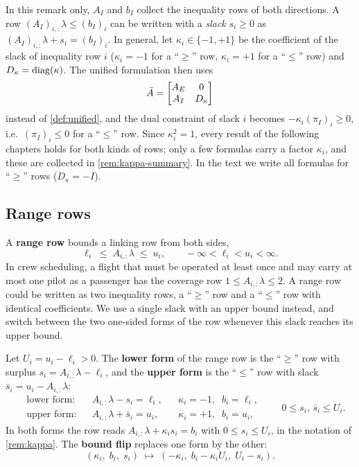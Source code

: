 \begin{remark} \label{rem:kappa}
In this remark only, $A_I$ and $b_I$ collect the inequality rows of both directions. A row
$(A_I)_{i,:}\lambda\le(b_I)_i$ can be written with a \emph{slack} $s_i\ge0$ as
$(A_I)_{i,:}\lambda + s_i = (b_I)_i$. In general, let $\kappa_i\in\{-1,+1\}$ be the coefficient of
the slack of inequality row $i$ ($\kappa_i = -1$ for a ``$\ge$'' row, $\kappa_i = +1$ for a
``$\le$'' row) and $D_\kappa = \operatorname{diag}(\kappa)$. The unified formulation then uses
\[
\bar{A} = \begin{bmatrix} A_E & 0\\ A_I & D_\kappa\end{bmatrix}
\]
instead of \cref{def:unified}, and the dual constraint of slack $i$ becomes
$-\kappa_i(\pi_I)_i\ge0$, i.e.\ $(\pi_I)_i\le0$ for a ``$\le$'' row. Since
$\kappa_i^2 = 1$, every result of the following chapters holds for both kinds of rows; only a
few formulas carry a factor $\kappa_i$, and these are collected in \cref{rem:kappa-summary}.
In the text we write all formulas for ``$\ge$'' rows ($D_\kappa = -I$).
\end{remark}

\subsection{Range rows}
\label{sec:range}

A \textbf{range row} bounds a linking row from both sides,
\[
\ell_i \;\le\; A_{i,:}\lambda \;\le\; u_i, \qquad -\infty < \ell_i < u_i < \infty .
\]
In crew scheduling, a flight that must be operated at least once and may carry at most one
pilot as a passenger has the coverage row $1\le A_{i,:}\lambda\le 2$. A range row could be
written as two inequality rows, a ``$\ge$'' row and a ``$\le$'' row with identical
coefficients. We use a single slack with an upper bound instead, and switch between the two
one-sided forms of the row whenever this slack reaches its upper bound.

\begin{definition} \label{def:range}
Let $U_i = u_i - \ell_i > 0$. The \textbf{lower form} of the range row is the ``$\ge$'' row
with surplus $s_i = A_{i,:}\lambda - \ell_i$, and the \textbf{upper form} is the ``$\le$'' row
with slack $\bar s_i = u_i - A_{i,:}\lambda$:
\[
\begin{aligned}
&\text{lower form:} && A_{i,:}\lambda - s_i = \ell_i, && \kappa_i = -1,\;\; b_i = \ell_i,\\
&\text{upper form:} && A_{i,:}\lambda + \bar s_i = u_i, && \kappa_i = +1,\;\; b_i = u_i,
\end{aligned}
\qquad 0\le s_i,\,\bar s_i\le U_i .
\]
In both forms the row reads $A_{i,:}\lambda + \kappa_i s_i = b_i$ with $0\le s_i\le U_i$, in
the notation of \cref{rem:kappa}. The \textbf{bound flip} replaces one form by the other:
\begin{equation} \label{eq:bound-flip}
(\kappa_i,\; b_i,\; s_i) \;\longmapsto\; (-\kappa_i,\; b_i - \kappa_i U_i,\; U_i - s_i).
\end{equation}
\end{definition}

